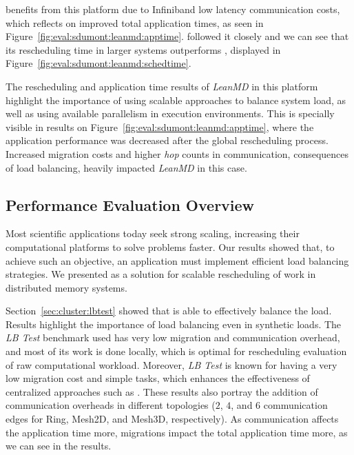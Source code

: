\distributedlb benefits from this platform due to Infiniband low latency communication costs, which reflects on improved total application times, as seen in Figure~\ref{fig:eval:sdumont:leanmd:apptime}.
\packdrop followed it closely and we can see that its rescheduling time in larger systems outperforms \distributedlb, displayed in Figure~\ref{fig:eval:sdumont:leanmd:schedtime}.

The rescheduling and application time results of \textit{LeanMD} in this platform highlight the importance of using scalable approaches to balance system load, as well as using available parallelism in execution environments.
This is specially visible in \greedylb results on Figure~\ref{fig:eval:sdumont:leanmd:apptime}, where the application performance was decreased after the global rescheduling process.
Increased migration costs and higher \textit{hop} counts in communication, consequences of load balancing, heavily impacted \textit{LeanMD} in this case.

\subsection{Performance Evaluation Overview} \label{eval:overview}

Most scientific applications today seek strong scaling, increasing their computational platforms to solve problems faster.
Our results showed that, to achieve such an objective, an application must implement efficient load balancing strategies.
We presented \packdrop as a solution for scalable rescheduling of work in distributed memory systems.

Section~\ref{sec:cluster:lbtest} showed that \packdrop is able to effectively balance the load. 
Results highlight the importance of load balancing even in synthetic loads.
The \textit{LB Test} benchmark used has very low migration and communication overhead, and most of its work is done locally, which is optimal for rescheduling evaluation of raw computational workload.
Moreover, \textit{LB Test} is known for having a very low migration cost and simple tasks, which enhances the effectiveness of centralized approaches such as .
These results also portray the addition of communication overheads in different topologies ($2$, $4$, and $6$ communication edges for Ring, Mesh2D, and Mesh3D, respectively). %
As communication affects the application time more, migrations impact the total application time more, as we can see in the \greedylb results.

